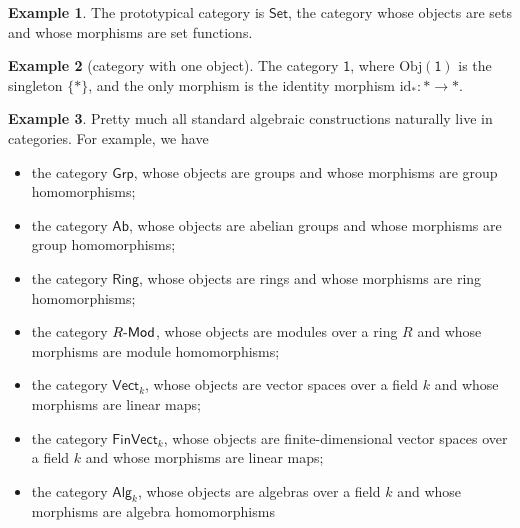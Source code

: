 \documentclass[a4paper,10pt]{scrreprt}
\newcommand{\Obj}{\mathrm{Obj}}
\def\mhyp{{\hbox{-}}}
\theoremstyle{definition}
\newtheorem{example}{Example}[section]
\theoremstyle{plain}
\theoremstyle{remark}
\begin{document}
\begin{example}
  The prototypical category is $\mathsf{Set}$, the category whose objects are sets and whose morphisms are set functions.  
\end{example}


\begin{example}[category with one object]
  \label{eg:categorywithoneobject}
  The category $\mathsf{1}$, where $\Obj(\mathsf{1})$ is the singleton $\{*\}$, and the only morphism is the identity morphism $\mathrm{id}_{*}\colon * \to *$.
\end{example}
\begin{example}
  \label{eg:examplesofcategories}
  Pretty much all standard algebraic constructions naturally live in categories. For example, we have 
  \begin{itemize} 
    \item the category $\mathsf{Grp}$, whose objects are groups and whose morphisms are group homomorphisms;

    \item \label{item:categoryab} the category $\mathsf{Ab}$, whose objects are abelian groups and whose morphisms are group homomorphisms;

    \item the category $\mathsf{Ring}$, whose objects are rings and whose morphisms are ring homomorphisms;

    \item the category $R\mhyp\mathsf{Mod}$, whose objects are modules over a ring $R$ and whose morphisms are module homomorphisms;

    \item the category $\mathsf{Vect}_{k}$, whose objects are vector spaces over a field $k$ and whose morphisms are linear maps;
    \item the category $\mathsf{FinVect}_{k}$, whose objects are finite-dimensional vector spaces over a field $k$ and whose morphisms are linear maps;
    \item the category $\mathsf{Alg}_{k}$, whose objects are algebras over a field $k$ and whose morphisms are algebra homomorphisms
  \end{itemize}
\end{example}
\end{document}
